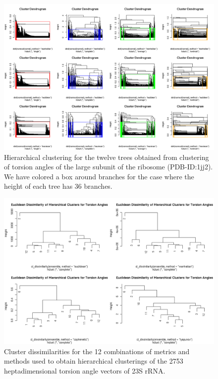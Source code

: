 \begin{figure}[htbp]
\centering
\includegraphics[angle=90, scale=0.55]{Chapter2/treetor_hc.png}
\caption{Hierarchical clustering for the twelve trees
obtained from clustering of torsion angles of the large subunit of 
the ribosome (PDB-ID:1jj2). We have colored a box around branches for the
case where the height of each tree has 36 branches.}
\label{fig:hclus}
\end{figure}

\begin{figure}[htbp]
\centering
\includegraphics[angle=90, scale=0.60]{Chapter2/clusdissimtor_hc.png}
\caption{Cluster dissimilarities for the 12 combinations of 
metrics and methods used to obtain hierarchical clusterings of the 2753 
heptadimensional torsion  angle vectors of 23S rRNA.}
\label{fig:clusdissim}
\end{figure}


